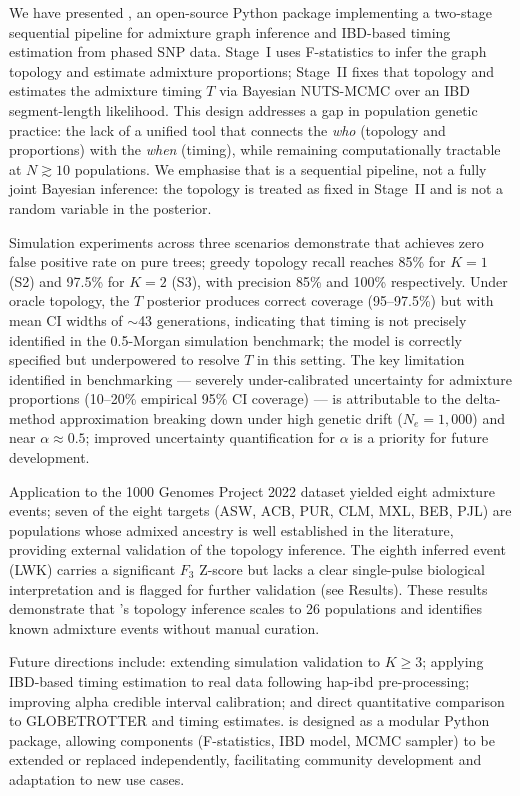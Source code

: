 
We have presented \hapgraph{}, an open-source Python package implementing
a two-stage sequential pipeline for admixture graph inference and IBD-based
timing estimation from phased SNP data.
Stage~I uses F-statistics to infer the graph topology and estimate admixture
proportions; Stage~II fixes that topology and estimates the admixture timing
$T$ via Bayesian NUTS-MCMC over an IBD segment-length likelihood.
This design addresses a gap in population genetic practice: the lack of a
unified tool that connects the \emph{who} (topology and proportions) with
the \emph{when} (timing), while remaining computationally tractable at
$N \gtrsim 10$ populations.
We emphasise that \hapgraph{} is a sequential pipeline, not a fully joint
Bayesian inference: the topology is treated as fixed in Stage~II and is
not a random variable in the posterior.

Simulation experiments across three scenarios demonstrate that \hapgraph{}
achieves zero false positive rate on pure trees; greedy topology recall
reaches 85\% for $K=1$ (S2) and 97.5\% for $K=2$ (S3), with precision 85\%
and 100\% respectively.
Under oracle topology, the $T$ posterior produces correct coverage
(95--97.5\%) but with mean CI widths of $\sim$43 generations, indicating
that timing is not precisely identified in the 0.5-Morgan simulation
benchmark; the model is correctly specified but underpowered to resolve
$T$ in this setting.
The key limitation identified in benchmarking — severely under-calibrated
uncertainty for admixture proportions (10--20\% empirical 95\% CI coverage)
— is attributable to the delta-method approximation breaking down under high
genetic drift ($N_e = 1{,}000$) and near $\alpha \approx 0.5$; improved
uncertainty quantification for $\alpha$ is a priority for future development.

Application to the 1000 Genomes Project 2022 dataset yielded eight admixture
events; seven of the eight targets (ASW, ACB, PUR, CLM, MXL, BEB, PJL)
are populations whose admixed ancestry is well established in the literature,
providing external validation of the topology inference.
The eighth inferred event (LWK) carries a significant $F_3$ Z-score but
lacks a clear single-pulse biological interpretation and is flagged for
further validation (see Results).
These results demonstrate that \hapgraph{}'s topology inference scales to
26 populations and identifies known admixture events without manual curation.

Future directions include: extending simulation validation to $K \geq 3$;
applying IBD-based timing estimation to real data following hap-ibd
pre-processing; improving alpha credible interval calibration; and direct
quantitative comparison to \textsc{GLOBETROTTER} and \alder{} timing estimates.
\hapgraph{} is designed as a modular Python package, allowing components
(F-statistics, IBD model, MCMC sampler) to be extended or replaced
independently, facilitating community development and adaptation to new
use cases.
